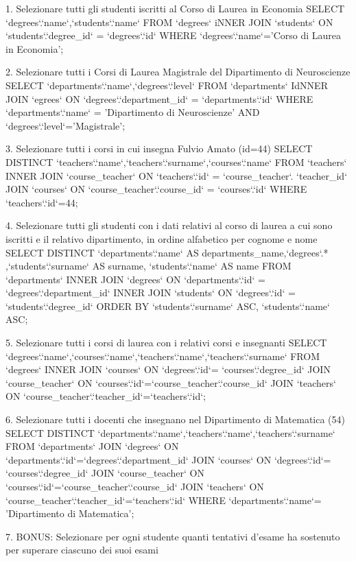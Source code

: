 1. Selezionare tutti gli studenti iscritti al Corso di Laurea in Economia
SELECT `degrees`.`name`,`students`.`name` FROM `degrees` iNNER JOIN `students` ON `students`.`degree_id` = `degrees`.`id` WHERE `degrees`.`name`='Corso di Laurea in Economia';


2. Selezionare tutti i Corsi di Laurea Magistrale del Dipartimento di Neuroscienze
SELECT `departments`.`name`,`degrees`.`level` FROM `departments` IdNNER JOIN `egrees` ON `degrees`.`department_id` = `departments`.`id` WHERE `departments`.`name` = 'Dipartimento di Neuroscienze' AND `degrees`.`level`='Magistrale';

3. Selezionare tutti i corsi in cui insegna Fulvio Amato (id=44)
SELECT DISTINCT `teachers`.`name`,`teachers`.`surname`,`courses`.`name` FROM `teachers` INNER JOIN `course_teacher` ON `teachers`.`id` = `course_teacher`. `teacher_id` JOIN `courses` ON `course_teacher`.`course_id` = `courses`.`id` WHERE `teachers`.`id`=44;

4. Selezionare tutti gli studenti con i dati relativi al corso di laurea a cui sono iscritti e il
relativo dipartimento, in ordine alfabetico per cognome e nome
SELECT DISTINCT `departments`.`name` AS departments_name,`degrees`.* ,`students`.`surname` AS surname, `students`.`name` AS name FROM `departments` INNER JOIN `degrees` ON `departments`.`id` = `degrees`.`department_id` INNER JOIN `students` ON `degrees`.`id` = `students`.`degree_id` ORDER BY `students`.`surname` ASC, `students`.`name` ASC;

5. Selezionare tutti i corsi di laurea con i relativi corsi e insegnanti
SELECT `degrees`.`name`,`courses`.`name`,`teachers`.`name`,`teachers`.`surname` FROM `degrees` INNER JOIN `courses` ON `degrees`.`id`= `courses`.`degree_id` JOIN `course_teacher` ON `courses`.`id`=`course_teacher`.`course_id` JOIN `teachers` ON `course_teacher`.`teacher_id`=`teachers`.`id`;


6. Selezionare tutti i docenti che insegnano nel Dipartimento di Matematica (54)
SELECT DISTINCT `departments`.`name`,`teachers`.`name`,`teachers`.`surname` FROM `departments` JOIN `degrees` ON `departments`.`id`=`degrees`.`department_id` JOIN `courses` ON `degrees`.`id`= `courses`.`degree_id` JOIN `course_teacher` ON `courses`.`id`=`course_teacher`.`course_id` JOIN `teachers` ON `course_teacher`.`teacher_id`=`teachers`.`id` WHERE `departments`.`name`= 'Dipartimento di Matematica';


7. BONUS: Selezionare per ogni studente quanti tentativi d’esame ha sostenuto per
superare ciascuno dei suoi esami